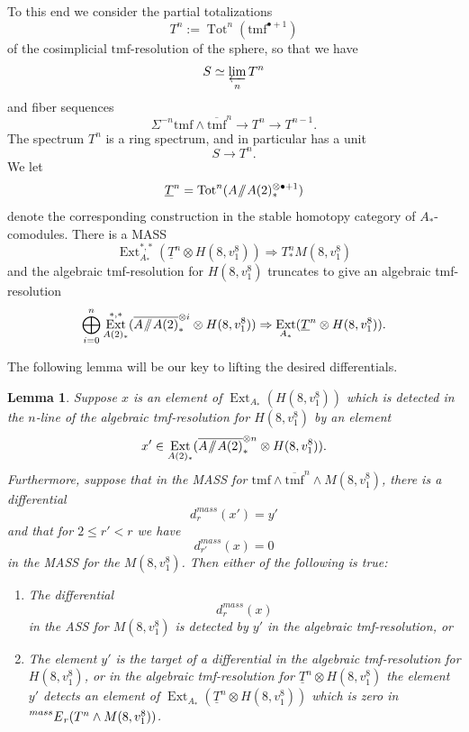 \documentclass[10pt]{amsart}
\newcommand{\sslash}{\mathbin{/\mkern-6mu/}}
\newcommand{\mmod}{\! \sslash \!}
\newcommand{\ul}[1]{\underline{#1}}
\newcommand{\br}[1]{\overline{#1}}
\newcommand{\tmf}{\mathrm{tmf}}
\newtheorem{lem}[equation]{Lemma}
\theoremstyle{definition}
\numberwithin{equation}{section}
\numberwithin{figure}{section}
\DeclareMathOperator{\Ext}{Ext}
\DeclareMathOperator*{\Tot}{Tot}
\newcommand{\E}[2]{\prescript{#1}{#2}{E}}
\begin{document}
To this end we consider the partial totalizations
$$ T^n := {\Tot}^n (\tmf^{\bullet+1}) $$
of the cosimplicial $\tmf$-resolution of the sphere, so that we have
$$ S \simeq \varprojlim_n T^n $$
and fiber sequences
$$ \Sigma^{-n}\tmf \wedge \br{\tmf}^{n} \rightarrow T^n \rightarrow T^{n-1}. $$
The spectrum $T^n$ is a ring spectrum, and in particular has a unit
$$ S \rightarrow T^n.$$
We let 
\begin{equation}\label{eq:Ful}
 \ul{T}^n = {\Tot}^n (A\mmod A(2)_*^{\otimes \bullet + 1})
\end{equation}
denote the corresponding construction in the stable homotopy category of $A_*$-comodules.
There is a MASS
$$ \Ext^{*,*}_{A_*}(\ul{T}^n \otimes H(8,v_1^8)) \Rightarrow T^n_*M(8,v_1^8) $$
and the algebraic tmf-resolution for $H(8,v_1^8)$ truncates to give an algebraic tmf-resolution 
$$ \bigoplus_{i = 0}^n  \Ext^{*,*}_{A(2)_*}(\br{A \mmod A(2)}_*^{\otimes i} \otimes H(8,v_1^8)) \Rightarrow \Ext_{A_*}(\ul{T}^n \otimes H(8,v_1^8)). $$

The following lemma will be our key to lifting the desired differentials.

\begin{lem}\label{lem:technical}
Suppose $x$ is an element of $\Ext_{A_*}(H(8,v_1^8))$ which is detected in the $n$-line of the algebraic tmf-resolution for $H(8,v_1^8)$ by an element
$$ x' \in \Ext_{A(2)_*}(\br{A \mmod A(2)}_*^{\otimes n} \otimes H(8,v_1^8)). $$
Furthermore, suppose that in the MASS for $\tmf \wedge \br{\tmf}^n \wedge M(8,v_1^8)$, there is a differential
$$ d^{mass}_r(x') = y' $$ 
and that for $2 \le r' < r$ we have
$$ d^{mass}_{r'}(x) = 0 $$
in the MASS for the $M(8,v_1^8)$.  Then either of the following is true:
\begin{enumerate}
\item The differential 
$$ d^{mass}_r(x) $$ 
in the ASS for $M(8,v_1^8)$ is detected by $y'$ in the algebraic tmf-resolution, or 
\item The element $y'$ is the target of a differential in the algebraic tmf-resolution for $H(8,v_1^8)$, or in the algebraic tmf-resolution for $\ul{T}^n \otimes H(8,v_1^8)$ the element $y'$ detects an element of $\Ext_{A_*}(\ul{T}^n \otimes H(8,v_1^8))$ which is zero in $\E{mass}{}_r(T^n \wedge M(8,v_1^8))$.
\end{enumerate}
\end{lem} 
\end{document}
